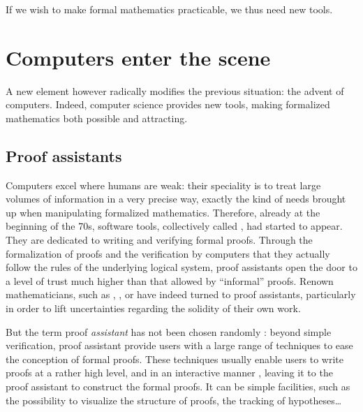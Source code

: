 If we wish to make formal mathematics practicable, we thus need new tools.

\section{Computers enter the scene}
\label{sec:proof-assistants}

A new element however radically modifies the previous situation: the advent of computers.
Indeed, computer science provides new tools, making formalized mathematics both possible
and attracting.

\subsection{Proof assistants}

Computers excel where humans are weak: their speciality is to treat large volumes of
information in a very precise way, exactly the kind of needs brought up when manipulating
formalized mathematics. Therefore, already at the beginning of the 70s,%
%
software tools, collectively called , had started to
appear. They are dedicated to writing and verifying formal proofs.
Through the formalization of proofs and the verification by computers that they
actually follow the rules of the underlying logical system, proof assistants open the
door to a level of trust much higher than that allowed by “informal” proofs.
Renown mathematicians, such as ,
, or  have indeed
turned to proof assistants, particularly in order to lift uncertainties regarding the
solidity of their own work.

But the term proof \emph{assistant} has not been chosen randomly : beyond simple verification,
proof assistant provide users with a large range of techniques to ease the conception of
formal proofs. These techniques usually enable users to write proofs at a rather
high level, and in an interactive manner%
,
leaving it to the proof assistant to construct the formal proofs.
It can be simple facilities, such as the possibility to visualize the structure of proofs,
the tracking of hypotheses…

